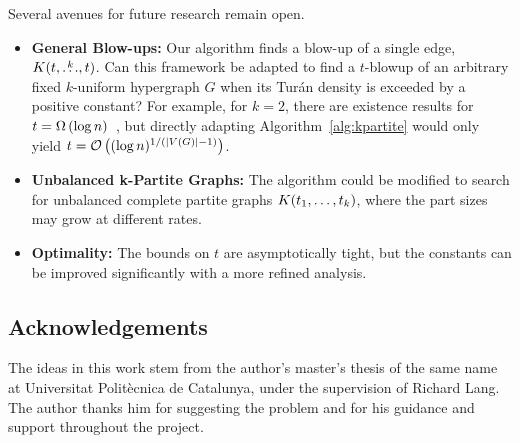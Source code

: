 Several avenues for future research remain open.
\begin{itemize}
    \item \textbf{General Blow-ups:} Our algorithm finds a blow-up of a single edge, $K(t, \overset{k}{\dots}, t)$.
    Can this framework be adapted to find a $t$-blowup of an arbitrary fixed $k$-uniform hypergraph $G$ when its Tur\'{a}n density is exceeded by a positive constant?
    For example, for $k=2$, there are existence results for $t = \Omega\left(\log n\right)$~\cite{bollobas1973structure}, but directly adapting Algorithm~\ref{alg:kpartite} would only
    yield $t = \mathcal{O}\left((\log n)^{1/(|V(G)| - 1)}\right)$.
    \item \textbf{Unbalanced k-Partite Graphs:} The algorithm could be modified to search for unbalanced complete partite graphs $K(t_1, \dots, t_k)$, where the part sizes may grow at different rates.
    \item \textbf{Optimality:} The bounds on $t$ are asymptotically tight, but the constants can be improved significantly with a more refined analysis.
\end{itemize}

\subsection*{Acknowledgements}

The ideas in this work stem from the author's master's thesis of the same name at
Universitat Polit\`{e}cnica de Catalunya,
under the supervision of Richard Lang.
The author thanks him for suggesting the problem and for his guidance and support throughout the project.
